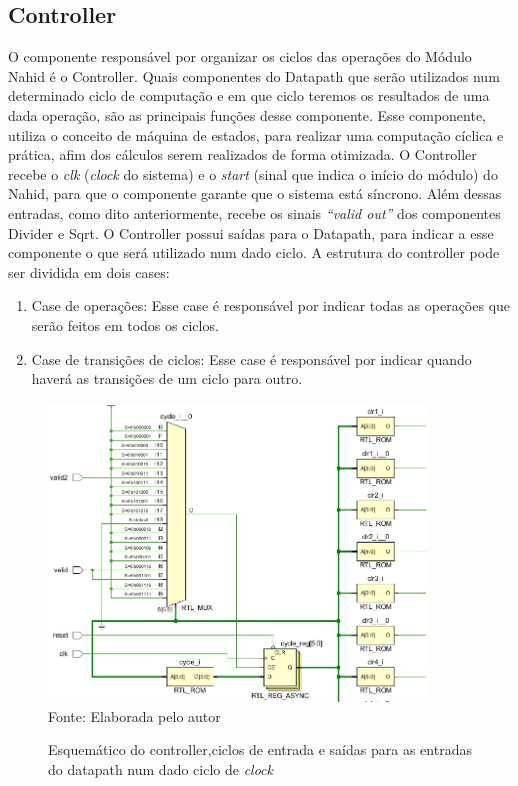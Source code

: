 \subsection{Controller}
O componente responsável por organizar os ciclos das operações do Módulo Nahid é o Controller. Quais componentes do Datapath que serão utilizados num determinado ciclo de computação e em que ciclo teremos os resultados de uma dada operação, são as principais funções desse componente. Esse componente, utiliza o conceito de máquina de estados, para realizar uma computação cíclica e prática, afim dos cálculos serem realizados de forma otimizada. O Controller recebe o \textit{clk} (\textit{clock} do sistema) e o \textit{start} (sinal que indica o início do módulo) do Nahid, para que o componente garante que o sistema está síncrono. Além dessas entradas, como dito anteriormente, recebe os sinais \textit{“valid out”} dos componentes Divider e Sqrt. O Controller possui saídas para o Datapath, para indicar a esse componente o que será utilizado num dado ciclo. A estrutura do controller pode ser dividida em dois cases:
\begin{enumerate}
	\item Case de operações: Esse case é responsável por indicar todas as operações que serão feitos em todos os ciclos. 
	\item Case de transições de ciclos: Esse case é responsável por indicar quando haverá as transições de um ciclo para outro.
\end{enumerate} 

\begin{figure}[H]
	\centering
		\caption{Esquemático do controller,ciclos de entrada e saídas para as  entradas do datapath num dado  ciclo de \textit{clock}}
	\includegraphics[width=10cm]{figures/controller.jpg}\\
	{Fonte: Elaborada pelo autor}	
	\label{ciclos}
\end{figure}

